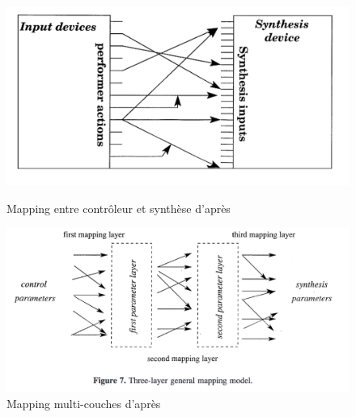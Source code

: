 \begin{figure}[!htbp]
	\captionsetup{format=plain}%
	\centering
	\begin{minipage}[t]{0.48\textwidth}
		\includegraphics[width=\linewidth]{gfx/04_algorithms/Wanderley_Schema1.png}
		\caption[Représentation du mapping \#1]{Mapping entre contrôleur et synthèse d'après \cite{hunt_towards_2000}}
		\label{fig:algorithms:DynamicMappingLayer1}
	\end{minipage}
	\hspace{.02\linewidth}
	\begin{minipage}[t]{0.48\textwidth}
	  \includegraphics[width=\linewidth]{gfx/04_algorithms/Wanderley_Schema2.png}
		\caption[Représentation du mapping \#2]{Mapping multi-couches d'après \cite{hunt_mapping_2002}}
		\label{fig:algorithms:DynamicMappingLayer2}
	\end{minipage}
\end{figure}

